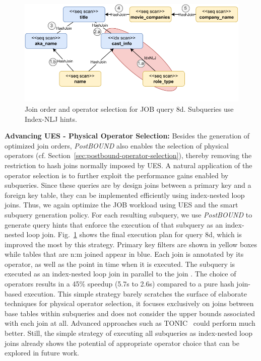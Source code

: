 \begin{figure}[tb]
	\centering
	\includegraphics[width=0.95\linewidth]{figures/idxnlj-example-job-8d.pdf}
	\caption{Join order and operator selection for JOB query 8d. Subqueries use Index-NLJ hints.}
	\label{fig:idxnlj-results}
	\vspace{-0.4cm}
\end{figure}

\textbf{Advancing UES - Physical Operator Selection:}
Besides the generation of optimized join orders, \emph{PostBOUND} also enables the selection of physical operators (cf. Section~\ref{sec:postbound-operator-selection}), thereby removing the restriction to hash joins normally imposed by UES. 
A natural application of the operator selection is to further exploit the performance gains enabled by subqueries. 
Since these queries are by design joins between a primary key and a foreign key table, they can be implemented efficiently using index-nested loop joins. 
Thus, we again optimize the JOB workload using UES and the smart subquery generation policy. 
For each resulting subquery, we use \emph{PostBOUND} to generate query hints that enforce the execution of that subquery as an index-nested loop join. Fig.~\ref{fig:idxnlj-results} shows the final execution plan for query 8d, which is improved the most by this strategy. 
Primary key filters are shown in yellow boxes while tables that are n:m joined appear in blue. 
Each join is annotated by its operator, as well as the point in time when it is executed. 
The subquery  is executed as an index-nested loop join in parallel to the join . 
The choice of operators results in a 45\% speedup (5.7s to 2.6s) compared to a pure hash join-based execution. 
This simple strategy barely scratches the surface of elaborate techniques for physical operator selection, it focuses exclusively on joins between base tables within subqueries and does not consider the upper bounds associated with each join at all. 
Advanced approaches such as TONIC~\cite{DBLP:journals/pvldb/HertzschuchHHL22} could perform much better. 
Still, the simple strategy of executing all subqueries as index-nested loop joins already shows the potential of appropriate operator choice that can be explored in future work.
